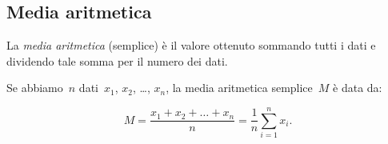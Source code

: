 \subsection{Media aritmetica}

\begin{definizione}
La \emph{media aritmetica} (semplice) è il valore ottenuto sommando tutti i dati e
dividendo tale somma per il numero dei dati.
\end{definizione}

Se abbiamo~$n$ dati~$x_1$, $x_2$, \ldots, $x_n$, la media aritmetica semplice~$M$ è data da:

\begin{equation*}
M=\frac{x_1+x_2+ \dots +x_n}{n}=\frac{1}{n}\sum_{i=1}^n x_i.
\end{equation*}

